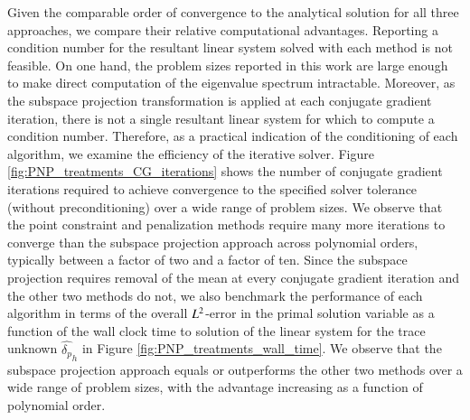 Given the comparable order of convergence to the analytical solution for all three approaches, we compare their relative computational advantages. 
Reporting a condition number for the resultant linear system solved with each method is not feasible. 
On one hand, the problem sizes reported in this work are large enough to make direct computation of the eigenvalue spectrum intractable.
Moreover, as the subspace projection transformation is applied at each conjugate gradient iteration, there is not a single resultant linear system for which to compute a condition number.
Therefore, as a practical indication of the conditioning of each algorithm, we examine the efficiency of the iterative solver.
Figure \ref{fig:PNP_treatments_CG_iterations} shows the number of conjugate gradient iterations required to achieve convergence to the specified solver tolerance (without preconditioning) over a wide range of problem sizes.
We observe that the point constraint and penalization methods require many more iterations to converge than the subspace projection approach across polynomial orders, typically between a factor of two and a factor of ten.
Since the subspace projection requires removal of the mean at every conjugate gradient iteration and the other two methods do not, we also benchmark the performance of each algorithm in terms of the overall $L^2$-error in the primal solution variable as a function of the wall clock time to solution of the linear system for the trace unknown $\hat{\delta_p}_h$ in Figure \ref{fig:PNP_treatments_wall_time}.
We observe that the subspace projection approach equals or outperforms the other two methods over a wide range of problem sizes, with the advantage increasing as a function of polynomial order.

